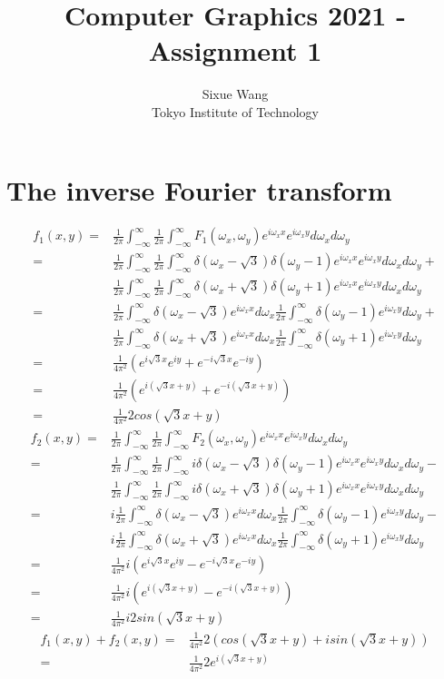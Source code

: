 \documentclass{article}
\title{Computer Graphics 2021 - Assignment 1}
\author{Sixue Wang\\Tokyo Institute of Technology}
\newcommand{\INT}{\frac{1}{2\pi} \int ^{\infty}_{-\infty}}
\newcommand{\wx}{\omega_x}
\newcommand{\wy}{\omega_y}
\newcommand{\ex}{e^{i\wx x}}
\newcommand{\ey}{e^{i\wx y}}
\newcommand{\dx}{d\wx}
\newcommand{\dy}{d\wy}
\begin{document}
\maketitle

\section{The inverse Fourier transform}
\begin{equation*}
  \begin{aligned}
    f_1(x,y) = &  \INT \INT F_1(\wx, \wy) \ex \ey \dx \dy \\
             = &  \INT \INT \delta(\wx-\sqrt{3}) \delta(\wy-1) \ex \ey \dx \dy + \\
               &  \INT \INT \delta(\wx+\sqrt{3}) \delta(\wy+1) \ex \ey \dx \dy   \\
             = &  \INT \delta(\wx-\sqrt{3}) \ex \dx \INT \delta(\wy-1) \ey \dy + \\
               &  \INT \delta(\wx+\sqrt{3}) \ex \dx \INT \delta(\wy+1) \ey \dy   \\
             = &  {\frac{1}{4\pi^2}} (e^{i\sqrt{3}x}e^{iy} + e^{-i\sqrt{3}x}e^{-iy}) \\
             = &  {\frac{1}{4\pi^2}} (e^{i(\sqrt{3}x+ y)} + e^{-i(\sqrt{3}x+y)}) \\
             = &  {\frac{1}{4\pi^2}} 2cos(\sqrt{3}x+y)
  \end{aligned}
\end{equation*}
\begin{equation*}
  \begin{aligned}
    f_2(x,y) = &  \INT \INT F_2(\wx, \wy) \ex \ey \dx \dy \\
             = &  \INT \INT i\delta(\wx-\sqrt{3}) \delta(\wy-1) \ex \ey \dx \dy - \\
               &  \INT \INT i\delta(\wx+\sqrt{3}) \delta(\wy+1) \ex \ey \dx \dy   \\
             = &  i\INT \delta(\wx-\sqrt{3}) \ex \dx \INT \delta(\wy-1) \ey \dy - \\
               &  i\INT \delta(\wx+\sqrt{3}) \ex \dx \INT \delta(\wy+1) \ey \dy   \\
             = &  {\frac{1}{4\pi^2}} i(e^{i\sqrt{3}x}e^{iy} - e^{-i\sqrt{3}x}e^{-iy}) \\
             = &  {\frac{1}{4\pi^2}} i(e^{i(\sqrt{3}x+ y)} - e^{-i(\sqrt{3}x+y)}) \\
             = &  {\frac{1}{4\pi^2}} i2sin(\sqrt{3}x+y)
  \end{aligned}
\end{equation*}
\begin{equation*}
  \begin{aligned}
    f_1(x,y) + f_2(x,y) = & {\frac{1}{4\pi^2}} 2 (cos(\sqrt{3}x+y) + isin(\sqrt{3}x+y))  \\
                        = & {\frac{1}{4\pi^2}} 2 e^{i(\sqrt{3}x+y)}
  \end{aligned}
\end{equation*}
\end{document}
